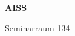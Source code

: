 \documentclass[a4paper]{article}
\begin{document}
\printGenericVSLHeader
\begin{center}
\begin{vsltext}{3cm}{4cm}

   \vspace{0.5cm} 

    \textbf{AISS} 

    \vspace{1.5cm}

    Seminarraum 134

\end{vsltext}

\end{center}
\end{document}
